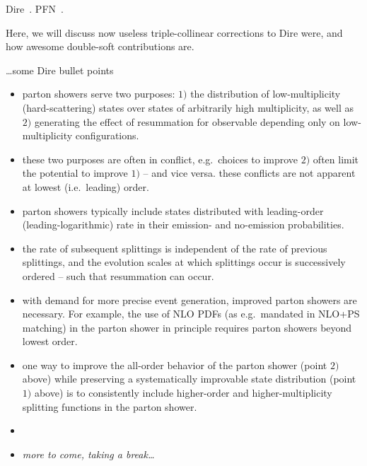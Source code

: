 
Dire~\cite{Hoche:2015sya}.  PFN~\cite{Komiske:2018cqr}.

Here, we will discuss now useless triple-collinear corrections to Dire were, and
how awesome double-soft contributions are.

\dots some Dire bullet points
\begin{itemize}
\item parton showers serve two purposes: $1)$ the distribution of low-multiplicity
(hard-scattering) states over states of arbitrarily high multiplicity, as well
as $2)$ generating the effect of resummation for observable depending only on 
low-multiplicity configurations.
\item these two purposes are often in conflict, e.g.\ choices to improve
$2)$ often limit the potential to improve $1)$ -- and vice versa. these
conflicts are not apparent at lowest (i.e.\ leading) order.
\item parton showers typically include states distributed with leading-order 
(leading-logarithmic) rate in their emission- and no-emission probabilities.
\item the rate of subsequent splittings is independent of the rate of
previous splittings, and the evolution scales at which splittings occur is
successively ordered -- such that resummation can occur.
\item with demand for more precise event generation, improved parton showers
are necessary. For example, the use of NLO PDFs (as e.g.\ mandated in NLO+PS
matching) in the parton shower in principle requires parton showers beyond
lowest order.
\item one way to improve the all-order behavior of the parton shower (point $2)$ 
above) while preserving a systematically improvable state distribution (point $1)$ 
above) is to consistently include higher-order and higher-multiplicity 
splitting functions in the parton shower.
\item
\item \emph{more to come, taking a break\dots}
\end{itemize}

